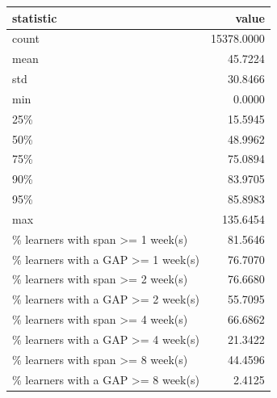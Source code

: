 \begin{tabular}{lr}
\toprule
statistic & value \\
\midrule
count & 15378.0000 \\
mean & 45.7224 \\
std & 30.8466 \\
min & 0.0000 \\
25\% & 15.5945 \\
50\% & 48.9962 \\
75\% & 75.0894 \\
90\% & 83.9705 \\
95\% & 85.8983 \\
max & 135.6454 \\
\% learners with span >= 1 week(s) & 81.5646 \\
\% learners with a GAP >= 1 week(s) & 76.7070 \\
\% learners with span >= 2 week(s) & 76.6680 \\
\% learners with a GAP >= 2 week(s) & 55.7095 \\
\% learners with span >= 4 week(s) & 66.6862 \\
\% learners with a GAP >= 4 week(s) & 21.3422 \\
\% learners with span >= 8 week(s) & 44.4596 \\
\% learners with a GAP >= 8 week(s) & 2.4125 \\
\bottomrule
\end{tabular}
